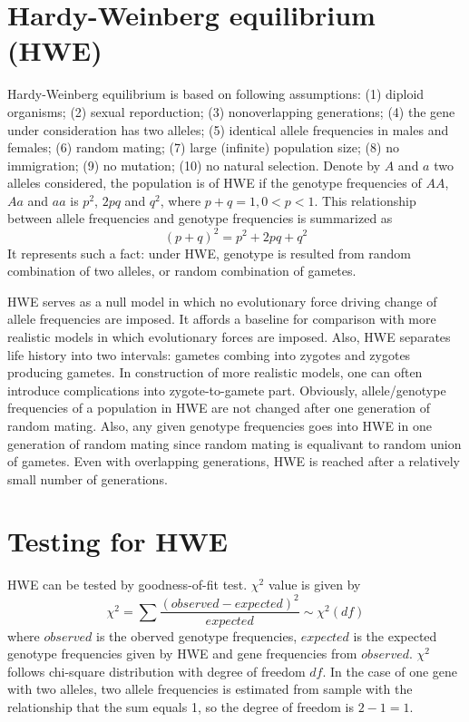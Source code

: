 \documentclass[11pt]{article}
\begin{document}
\begin{sloppypar}
\section{Hardy-Weinberg equilibrium (HWE)}
Hardy-Weinberg equilibrium is based on following assumptions: 
(1) diploid organisms; (2) sexual reporduction; (3) nonoverlapping generations; (4) the gene under consideration has two alleles; (5) identical allele frequencies in males and females; (6) random mating; (7) large (infinite) population size; (8) no immigration; (9) no mutation; (10) no natural selection. 
Denote by $A$ and $a$ two alleles considered, the population is of HWE if the genotype frequencies of $AA$, $Aa$ and $aa$ is $p^2$, $2pq$ and $q^2$, where $p+q=1,0<p<1$. 
This relationship between allele frequencies and genotype frequencies is summarized as 
\begin{equation}
  (p+q)^2=p^2+2pq+q^2
\end{equation}
It represents such a fact: under HWE, genotype is resulted from random combination of two alleles, or random combination of gametes. 

\par

HWE serves as a null model in which no evolutionary force driving change of allele frequencies are imposed. 
It affords a baseline for comparison with more realistic models in which evolutionary forces are imposed. 
Also, HWE separates life history into two intervals: gametes combing into zygotes and zygotes producing gametes. 
In construction of more realistic models, one can often introduce complications into zygote-to-gamete part. 
Obviously, allele/genotype frequencies of a population in HWE are not changed after one generation of random mating. 
Also, any given genotype frequencies goes into HWE in one generation of random mating since random mating is equalivant to random union of gametes. 
Even with overlapping generations, HWE is reached after a relatively small number of generations. 

\section{Testing for HWE}
HWE can be tested by goodness-of-fit test. 
$\chi^2$ value is given by 
\begin{equation}
  \chi^2=\sum\frac{(observed-expected)^2}{expected} \sim \chi^2(df)
  \label{chi-square}
\end{equation}
where $observed$ is the oberved genotype frequencies, $expected$ is the expected genotype frequencies given by HWE and gene frequencies from $observed$. 
$\chi^2$ follows chi-square distribution with degree of freedom $df$. 
In the case of one gene with two alleles, two allele frequencies is estimated from sample with the relationship that the sum equals 1, so the degree of freedom is $2-1=1$.


\end{sloppypar}
\end{document}
